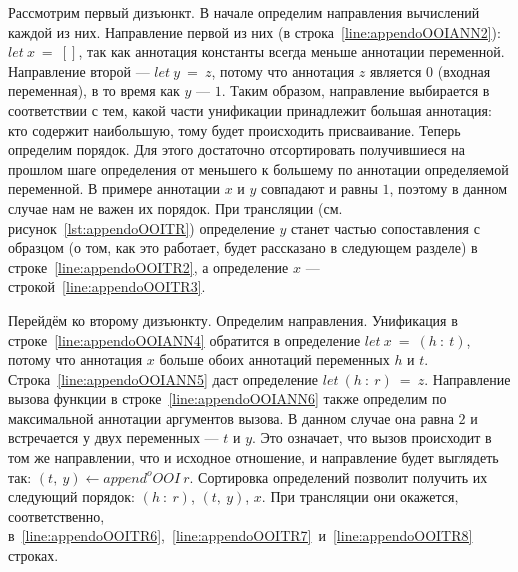 Рассмотрим первый дизъюнкт.
В начале определим направления вычислений каждой из них.
Направление первой из них (в строка~\ref{line:appendoOOIANN2}): $let~x~=~[]$, так как аннотация константы всегда меньше аннотации переменной.
Направление второй --- $let~y~=~z$, потому что аннотация $z$ является $0$ (входная переменная), в то время как $y$ --- $1$.
Таким образом, направление выбирается в соответствии с тем, какой части унификации принадлежит большая аннотация: кто содержит наибольшую, тому будет происходить присваивание.
Теперь определим порядок.
Для этого достаточно отсортировать получившиеся на прошлом шаге определения от меньшего к большему по аннотации определяемой переменной.
В примере аннотации $x$ и $y$ совпадают и равны $1$, поэтому в данном случае нам не важен их порядок.
При трансляции (см. рисунок~\ref{lst:appendoOOITR}) определение $y$ станет частью сопоставления с образцом (о том, как это работает, будет рассказано в следующем разделе) в строке~\ref{line:appendoOOITR2}, а определение $x$ --- строкой~\ref{line:appendoOOITR3}.

Перейдём ко второму дизъюнкту.
Определим направления.
Унификация в строке~\ref{line:appendoOOIANN4} обратится в определение $let~x~=~(h~:~t)$, потому что аннотация $x$ больше обоих аннотаций переменных $h$ и $t$.
Строка~\ref{line:appendoOOIANN5} даст определение $let~(h~:~r)~=~z$.
Направление вызова функции в строке~\ref{line:appendoOOIANN6} также определим по максимальной аннотации аргументов вызова.
В данном случае она равна $2$ и встречается у двух переменных --- $t$ и $y$.
Это означает, что вызов происходит в том же направлении, что и исходное отношение, и направление будет выглядеть так: $(t,~y) \leftarrow append^oOOI~r$.
Сортировка определений позволит получить их следующий порядок: $(h~:~r)$, $(t,~y)$, $x$.
При трансляции они окажется, соответственно, в~\ref{line:appendoOOITR6},~\ref{line:appendoOOITR7}~и~\ref{line:appendoOOITR8} строках.
